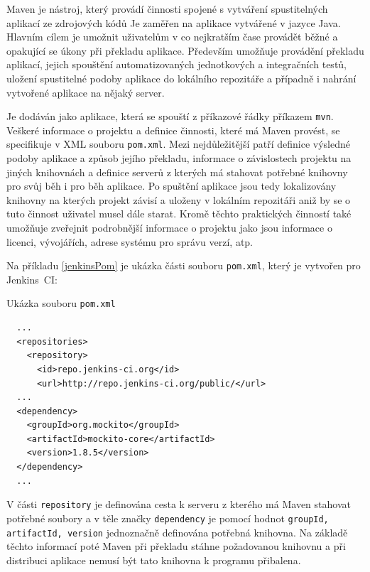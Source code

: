         Maven je nástroj, který provádí činnosti spojené s vytváření spustitelných aplikací ze zdrojových kódů 
        Je zaměřen na aplikace vytvářené v jazyce Java. Hlavním cílem je umožnit uživatelům v co nejkratším
        čase provádět běžné a opakující se úkony při překladu aplikace. Především umožňuje
        provádění překladu aplikací, jejich spouštění automatizovaných jednotkových a 
        integračních testů, uložení spustitelné podoby aplikace do lokálního repozitáře 
        a případně i nahrání vytvořené aplikace na nějaký server. 

        Je dodáván jako aplikace, která se spouští z příkazové řádky příkazem \texttt{mvn}. Veškeré
        informace o projektu a definice činnosti, které má Maven provést, se specifikuje 
        v XML souboru \texttt{pom.xml}. Mezi nejdůležitější patří definice výsledné podoby aplikace
        a způsob jejího překladu, informace o závislostech
        projektu na jiných knihovnách a definice serverů z kterých má stahovat potřebné knihovny pro svůj 
        běh i pro běh aplikace. Po spuštění aplikace jsou tedy lokalizovány knihovny na kterých projekt
        závisí a uloženy v lokálním repozitáři aniž by se o tuto činnost uživatel musel dále starat.
        Kromě těchto praktických činností také umožňuje zveřejnit podrobnější informace o projektu         
        jako jsou informace o licenci, vývojářích, adrese systému pro správu verzí, atp.


        Na příkladu \ref{jenkinsPom} je ukázka části souboru \texttt{pom.xml}, který je vytvořen pro Jenkins~CI:
        \begin{priklad} \label{jenkinsPom} 
            Ukázka souboru \texttt{pom.xml}
\begin{verbatim}
  ...
  <repositories>
    <repository>
      <id>repo.jenkins-ci.org</id>
      <url>http://repo.jenkins-ci.org/public/</url>
  ...
  <dependency>
    <groupId>org.mockito</groupId>
    <artifactId>mockito-core</artifactId>
    <version>1.8.5</version>
  </dependency>
  ...
\end{verbatim}
        \end{priklad}

        V části \texttt{repository} je definována cesta k serveru z kterého má Maven stahovat potřebné soubory
        a v těle značky \texttt{dependency} je pomocí hodnot \texttt{groupId, artifactId, version} jednoznačně
        definována potřebná knihovna. Na základě těchto informací poté Maven při překladu stáhne požadovanou
        knihovnu a při distribuci aplikace nemusí být tato knihovna k programu přibalena. 


